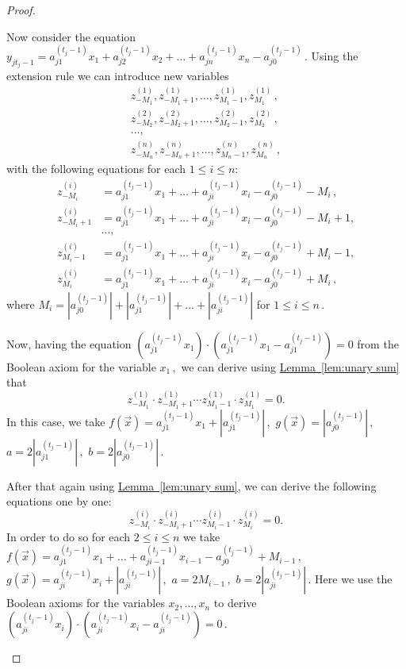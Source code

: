 \documentclass[11pt]{article}
\newcommand{\expref}[2]{\texorpdfstring{\hyperref[#2]{#1~\ref{#2}}}{#1~\ref{#2}}}
\begin{document}
\begin{proof}
\begin{itemize}
Now consider the equation %
$y_{j t_{j} - 1} = a_{j 1}^{(t_j - 1)}x_1 + a_{j 2}^{(t_j - 1)}x_2 + \ldots + a_{j n}^{(t_j - 1)}x_n - a_{j 0}^{(t_j - 1)}\,.$ %
 Using the extension rule we can introduce new variables
\begin{align*}
z_{-M_1}^{(1)}, z_{-M_1 + 1}^{(1)}, \ldots, z_{M_1 - 1}^{(1)}, z_{M_1}^{(1)}\,, \\
z_{-M_2}^{(2)}, z_{-M_2 + 1}^{(2)}, \ldots, z_{M_2 - 1}^{(2)}, z_{M_2}^{(2)}\,, \\
\ldots, \\
z_{-M_n}^{(n)}, z_{-M_n + 1}^{(n)}, \ldots, z_{M_n - 1}^{(n)}, z_{M_n}^{(n)}\,, 
\end{align*}
with the following equations for each $1 \le i \le n$:
\begin{align*}
%
%
%
z_{-M_i}^{(i)} &= a_{j 1}^{(t_j - 1)}x_1  + \ldots + a_{j i}^{(t_j - 1)}x_i - a_{j 0}^{(t_j - 1)} - M_i\,, \\
z_{-M_i + 1}^{(i)} &= a_{j 1}^{(t_j - 1)}x_1  + \ldots + a_{j i}^{(t_j - 1)}x_i - a_{j 0}^{(t_j - 1)} - M_i + 1, \\
&\ldots, \\
z_{M_i - 1}^{(i)} &=  a_{j 1}^{(t_j - 1)}x_1  + \ldots + a_{j i}^{(t_j - 1)}x_i - a_{j 0}^{(t_j - 1)} + M_i - 1, \\
z_{M_i}^{(i)} &=  a_{j 1}^{(t_j - 1)}x_1  + \ldots + a_{j i}^{(t_j - 1)}x_i - a_{j 0}^{(t_j - 1)} + M_i\,,
\end{align*}
%
where $M_i = |a_{j 0}^{(t_j - 1)}| + |a_{j 1}^{(t_j - 1)}| + \ldots + |a_{j i}^{(t_j - 1)}|$ for %
$1 \le i \le n\,.$ %
%

Now, having the equation $(a_{j1}^{(t_j - 1)} x_1) \cdot  (a_{j1}^{(t_j - 1)} x_1 - a_{j1}^{(t_j - 1)}) = 0$ from the Boolean axiom for the variable %
$x_1\,,$ %
 we can derive using \expref{Lemma}{lem:unary sum} that
$$
z_{-M_1}^{(1)} \cdot z_{-M_1 + 1}^{(1)}  \cdots z_{M_1 - 1}^{(1)} \cdot z_{M_1}^{(1)} = 0.
$$
In this case, we take %
$f(\vec x) = a_{j1}^{(t_j - 1)} x_1 + |a_{j1}^{(t_j - 1)}|\,,$ %
$g(\vec x) = |a_{j0}^{(t_j - 1)}|\,,$ %
$a = 2 |a_{j1}^{(t_j - 1)}|\,,$ %
$b =  2 |a_{j0}^{(t_j - 1)}|\,.$ %

After that again using \expref{Lemma}{lem:unary sum}, we can derive the following equations one by one:
$$
z_{-M_i}^{(i)} \cdot z_{-M_i + 1}^{(i)}  \cdots z_{M_i - 1}^{(i)} \cdot z_{M_i}^{(i)} = 0.
$$
In order to do so for each $2 \le i \le n$ we take %
$f(\vec x) = a_{j 1}^{(t_j - 1)}x_1  + \ldots + a_{j i - 1}^{(t_j - 1)}x_{i - 1} - a_{j 0}^{(t_j - 1)} + M_{i - 1}\,,$ %
$g(\vec x) = a_{ji}^{(t_j - 1)}x_i + |a_{ji}^{(t_j - 1)}|\,,$ %
$a = 2 M_{i - 1}\,,$ %
$b =  2 |a_{ji}^{(t_j - 1)}|\,.$ %
 Here we use the Boolean axioms for the variables $x_2, \ldots, x_n$ to derive %
$(a_{ji}^{(t_j - 1)} x_i) \cdot  (a_{ji}^{(t_j - 1)} x_i - a_{ji}^{(t_j - 1)}) = 0\,.$ %


\end{itemize}
\end{proof}
\end{document}
